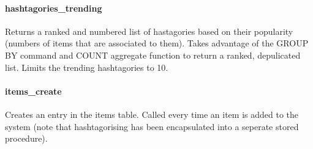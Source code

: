 \paragraph{hashtagories\_trending}\label{hashtagoriesux5ftrending}

Returns a ranked and numbered list of hastagories based on their
popularity (numbers of items that are associated to them). Takes
advantage of the GROUP BY command and COUNT aggregate function to return
a ranked, depulicated list. Limits the trending hashtagories to 10.

\begin{Shaded}
\begin{Highlighting}[]
 
     \NormalTok{(*) } 
     
       
         
     \NormalTok{;}
\end{Highlighting}
\end{Shaded}

\paragraph{items\_create}\label{itemsux5fcreate}

Creates an entry in the items table. Called every time an item is added
to the system (note that hashtagorising has been encapsulated into a
seperate stored procedure).

\begin{Shaded}
\begin{Highlighting}[]
  \NormalTok{(}\NormalTok{), } \NormalTok{(}\NormalTok{), } \NormalTok{(}\NormalTok{))}
      
     
\end{Highlighting}
\end{Shaded}

